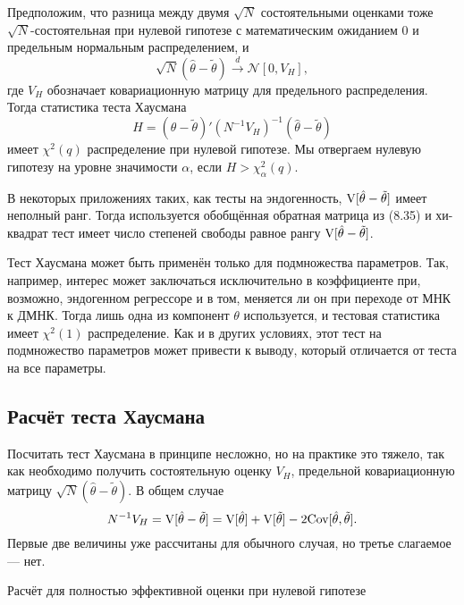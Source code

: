 Предположим, что разница между двумя $\sqrt{N}$ состоятельными оценками тоже $\sqrt{N}$-состоятельная при нулевой гипотезе с математическим ожиданием 0 и предельным нормальным распределением, и
\[
\sqrt{N}(\hat{\theta} - \tilde{\theta}) \stackrel{d}{\rightarrow} \mathcal{N}[0, V_H],
\]
где $V_H$ обозначает ковариационную матрицу для предельного распределения. Тогда статистика теста Хаусмана
\begin{equation}
H = (\hat{\theta} - \tilde{\theta})'(N^{-1}V_H)^{-1}(\hat{\theta} - \tilde{\theta})
\end{equation}
имеет $\chi^2(q)$ распределение при нулевой гипотезе. Мы отвергаем нулевую гипотезу на уровне значимости $\alpha$, если $H > \chi_{\alpha}^2(q)$.

В некоторых приложениях таких, как тесты на эндогенность, $\mathrm{V}[\hat{\theta} - \tilde{\theta}]$ имеет неполный ранг. Тогда используется обобщённая обратная матрица из (8.35) и хи-квадрат тест имеет число степеней
свободы равное рангу $\mathrm{V}[\hat{\theta} - \tilde{\theta}]$.

Тест Хаусмана может быть применён только для подмножества параметров. Так, например, интерес может заключаться исключительно в коэффициенте при, возможно, эндогенном регрессоре и в том, меняется ли он при переходе от МНК к ДМНК. Тогда лишь одна из компонент $\theta$ используется, и тестовая статистика имеет $\chi^2(1)$ распределение. Как и в других условиях, этот тест на подмножество параметров может привести к выводу, который отличается от теста на все параметры.

\subsection{Расчёт теста Хаусмана}

Посчитать тест Хаусмана в принципе несложно, но на практике это тяжело, так как необходимо получить состоятельную оценку $V_H$, предельной ковариационную матрицу $\sqrt{N}(\hat{\theta} - \tilde{\theta})$. В общем случае
\begin{equation}
N^{-1}V_H = \mathrm{V}[\hat{\theta} - \tilde{\theta}] = \mathrm{V}[\hat{\theta}] + \mathrm{V}[\tilde{\theta}] - 2\mathrm{Cov}[\hat{\theta},\tilde{\theta}].
\end{equation}
Первые две величины уже рассчитаны для обычного случая, но третье слагаемое --- нет.

\begin{center}
Расчёт для полностью эффективной оценки при нулевой гипотезе
\end{center}

